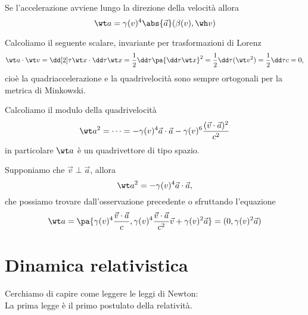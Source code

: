 \begin{remark}
Se l'accelerazione avviene lungo la direzione della velocit\`a allora
\[\wt a=\gamma(v)^4\abs{\vec a}(\beta(v),\wh v)\]
\end{remark}

\begin{remark}
Calcoliamo il seguente scalare, invariante per trasformazioni di Lorenz
\[\wt a\cdot \wt v=\dd[2]\tau{\wt x}\cdot \dd \tau{\wt x}=\frac12\dd\tau{}\pa{\dd \tau{\wt x}}^2=\frac 12\dd\tau{}(\wt v^2)=\frac 12\dd\tau c=0,\]
cio\`e la quadriaccelerazione e la quadrivelocit\`a sono sempre ortogonali per la metrica di Minkowski.
\end{remark}

\begin{remark}
Calcoliamo il modulo della quadrivelocit\`a
\[\wt a^2=\cdots=-\gamma(v)^4\vec a\cdot\vec a-\gamma(v)^6\frac{(\vec v\cdot \vec a)^2}{c^2}\]
in particolare $\wt a$ \`e un quadrivettore di tipo spazio.
\end{remark}

\begin{remark}
Supponiamo che $\vec v\perp \vec a$, allora
\[\wt a^2=-\gamma(v)^4\vec a\cdot \vec a,\]
che possiamo trovare dall'osservazione precedente o sfruttando l'equazione \[\wt a=\pa{\gamma(v)^4\frac{\vec v\cdot \vec a}{c},\gamma(v)^4\frac{\vec v\cdot \vec a}{c^2}\vec v+\gamma(v)^2\vec a}=(0,\gamma(v)^2\vec a)\]
\end{remark}




\section{Dinamica relativistica}
Cerchiamo di capire come leggere le leggi di Newton:\\
La prima legge \`e il primo postulato della relativit\`a.
\medskip

